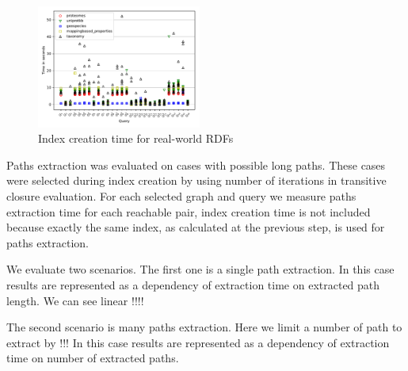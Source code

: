 \begin{figure}
   \includegraphics[width=0.48\textwidth]{data/other_all.pdf}
   \caption{Index creation time for real-world RDFs}
   \label{fig:other_all_qs}
\end{figure}

Paths extraction was evaluated on cases with possible long paths.
These cases were selected during index creation by using number of iterations in transitive closure evaluation.
For each selected graph and query we measure paths extraction time for each reachable pair, index creation time is not included because exactly the same index, as calculated at the previous step, is used for paths extraction. 

We evaluate two scenarios.
The first one is a single path extraction.
In this case results are represented as a dependency of extraction time on extracted path length.
We can see linear !!!!

The second scenario is many paths extraction.
Here we limit a number of path to extract by !!! 
In this case results are represented as a dependency of extraction time on number of extracted paths.


